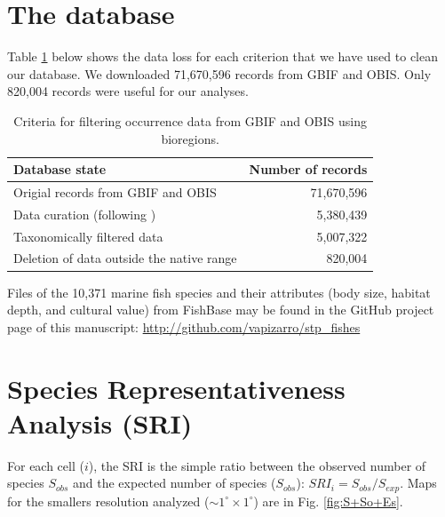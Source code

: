 \documentclass[12pt,authoryear]{elsarticle}
\renewcommand{\thefigure}{\arabic{figure}}
\begin{document}
\clearpage
\appendix
\setcounter{table}{0}
\setcounter{figure}{0}
\renewcommand{\thefigure}{A.\arabic{figure}}

\section{The database}
\label{sec:appDB}
Table \ref{tab:data cleaning} below shows the data loss for each criterion that we have used to clean our database. We downloaded 71,670,596 records from GBIF and OBIS. Only 820,004 records were useful for our analyses.

\begin{table}[h]
\centering
\begin{tabular}{ l  r }

\textbf{Database state} & \textbf{Number of records}\\ 
  \hline
  \hline
  Origial records from GBIF and OBIS & 71,670,596 \\ 
  Data curation (following  \cite{zizka2020}) & 5,380,439\\
  Taxonomically filtered data & 5,007,322\\ 
  Deletion of data outside the native range & 820,004\\ 
  \hline
   \hline
\end{tabular}
\caption{Criteria for filtering occurrence data from GBIF and OBIS using bioregions.}
\label{tab:data cleaning}
\end{table}

Files of the 10,371 marine fish species and their attributes (body size, habitat depth, and cultural value) from FishBase may be found in the GitHub project page of this manuscript: \href{https://github.com/vapizarro/stp_fishes}{http://github.com/vapizarro/stp\_fishes}

\section{Species Representativeness Analysis (SRI)}
\label{sec: Smaps}

For each cell ($i$), the SRI is the simple ratio between the observed number of species $S_{obs}$ and the expected number of species ($S_{obs}$): $SRI_i = S_{obs} / S_{exp}$. Maps for the smallers resolution analyzed ($ \sim 1^{\circ} \times 1^{\circ}$) are in Fig. \ref{fig:S+So+Es}. 
\end{document}
